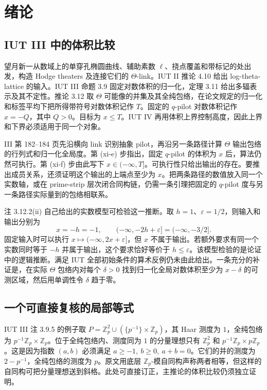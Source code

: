 \documentclass[UTF8,fontset=none,zihao=-4,a4paper]{ctexart}
\newcommand{\Z}{\mathbb Z}
\begin{document}
\newpage
\section{绪论}
\subsection{IUT III 中的体积比较}
望月新一从数域上的单穿孔椭圆曲线、辅助素数 \(\ell\)、挠点覆盖和带标记的处出发，构造 Hodge theaters 及连接它们的 \(\Theta\)-link。IUT II 推论 4.10 给出 log-theta-lattice 的输入。IUT III 命题 3.9 固定对数体积的归一化，定理 3.11 给出多辐表示及其不定性。推论 3.12 取 \(\Theta\) 可能像的并集及其全纯包络，在论文规定的归一化和标签平均下把所得带符号对数体积记作 \(T\)。固定的 \(q\)-pilot 对数体积记作 \(x=-Q\)，其中 \(Q>0\)。目标为 \(x\le T\)。IUT IV 再用体积上界控制高度，因此上界和下界必须适用于同一个对象。\cite{mi,mii,miii,miv}

III 第 182--184 页先沿横向 link 识别抽象 pilot，再沿另一条路径计算 \(\Theta\) 输出包络的行列式和归一化全局度。第 (xi-e) 步指出，固定 \(q\)-pilot 的体积为 \(x\) 后，算法仍然可执行。第 (xi-f) 步由此写下 \(x\in(-\infty,T]\)。可执行性只给出输出的存在。要推出成员关系，还须证明这个输出的上端点至少为 \(x\)。把两条路径的数值放入同一个实数轴，或在 prime-strip 层次闭合同构链，仍需一条引理把固定的 \(q\)-pilot 度与另一条路径实际量到的包络相联系。\cite[第 181--185 页]{miii}

注 3.12.2(ii) 自己给出的实数模型可检验这一推断。取 \(h=1\)、\(\varepsilon=1/2\)，则输入和输出分别为
\[
x=-h=-1,\qquad (-\infty,-2h+\varepsilon]=(-\infty,-3/2].
\]
固定输入时可以执行 \(x\mapsto(-\infty,2x+\varepsilon]\)，但 \(x\) 不属于输出。若额外要求有同一个实数同时等于 \(-h\) 并属于输出，这个要求恰好等价于 \(h\le\varepsilon\)。该模型检验的是论证中的逻辑推断。满足 IUT 全部初始条件的算术反例仍未由此给出。一条充分的补证是，在实际 \(\Theta\) 包络内对每个 \(\delta>0\) 找到归一化全局对数体积至少为 \(x-\delta\) 的可测区域，然后用单调性令 \(\delta\) 趋于零。\cite[注 3.12.2(ii)，第 188--191 页]{miii}

\subsection{一个可直接复核的局部等式}
IUT III 注 3.9.5 的例子取 \(P=\Z_p^2\cup(\{p^{-1}\}\times\Z_p)\)，其 Haar 测度为 \(1\)，全纯包络为 \(p^{-1}\Z_p\times\Z_p\)。位于全纯包络内、测度同为 \(1\) 的分量理想只有 \(\Z_p^2\) 和 \(p^{-1}\Z_p\times p\Z_p\)。这是因为指数 \((a,b)\) 必须满足 \(a\ge-1,\ b\ge0,\ a+b=0\)。它们的并的测度为 \(2-p^{-1}\)，全纯包络的测度为 \(p\)。原文用底层 \(\Z_p\)-模自同构声称两者相等，但这样的自同构可把分量理想送到斜格。此处可直接订正，主推论的体积比较仍须独立证明。\cite[注 3.9.5，第 127--129 页]{miii}
\end{document}
